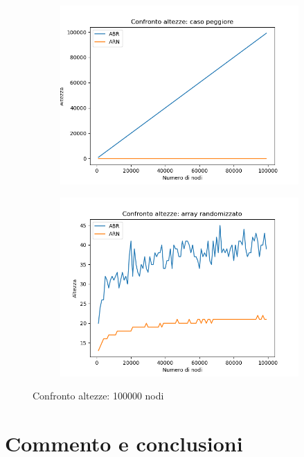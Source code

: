 \documentclass[
]{article}
\begin{document}
\begin{figure}[h!]
	\centering
	\begin{subfigure}[b]{0.4\linewidth}
		\includegraphics[width=\linewidth]{../../img/w_case/h_100000.png}
	\end{subfigure}
	\begin{subfigure}[b]{0.4\linewidth}
		\includegraphics[width=\linewidth]{../../img/rand/h_100000.png}
	\end{subfigure}
	\caption{Confronto altezze: 100000 nodi}
	\label{fig:5}
\end{figure}

\newpage

\hypertarget{commento-e-conclusioni}{%
\section{Commento e conclusioni}\label{commento-e-conclusioni}}
\end{document}
